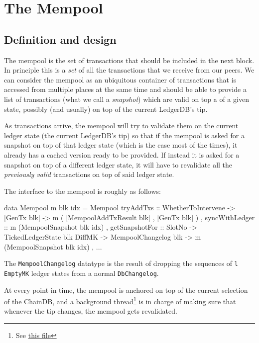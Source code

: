 \documentclass[11pt,a4paper]{article}
\newcommand{\htt}[1]{\texttt{#1}}
\theoremstyle{definition}
\begin{document}
\section{The Mempool}

\subsection{Definition and design}

The mempool is the set of transactions that should be included in the next
block. In principle this is a \emph{set} of all the transactions that we receive
from our peers. We can consider the mempool as an ubiquitous container of
transactions that is accessed from multiple places at the same time and should
be able to provide a list of transactions (what we call a \emph{snapshot}) which
are valid on top a of a given state, possibly (and usually) on top of the current LedgerDB's
tip.

As transactions arrive, the mempool will try to validate them on the current
ledger state (the current LedgerDB's tip) so that if the mempool is asked for a
snapshot on top of that ledger state (which is the case most of the times), it
already has a cached version ready to be provided. If instead it is asked for a
snapshot on top of a different ledger state, it will have to revalidate all the
\emph{previously valid} transactions on top of said ledger state.

The interface to the mempool is roughly as follows:

\begin{code}
data Mempool m blk idx = Mempool {
   tryAddTxs      :: WhetherToIntervene
                  -> [GenTx blk]
                  -> m ( [MempoolAddTxResult blk]
                       , [GenTx blk]
                       )
 , syncWithLedger :: m (MempoolSnapshot blk idx)
 , getSnapshotFor :: SlotNo
                  -> TickedLedgerState blk DiffMK
                  -> MempoolChangelog blk
                  -> m (MempoolSnapshot blk idx)
 , ...
}
\end{code}

The \htt{MempoolChangelog} datatype is the result of dropping the sequences of \htt{l EmptyMK} ledger states from a normal \htt{DbChangelog}.

At every point in time, the mempool is anchored on top of the current selection
of the ChainDB, and a background thread\footnote{See
  \href{https://github.com/input-output-hk/ouroboros-network/tree/feature/utxo-hd/ouroboros-consensus/src/Ouroboros/Consensus/Background.hs}{this file}}
is in charge of making sure that whenever the tip changes, the mempool gets
revalidated.
\end{document}
